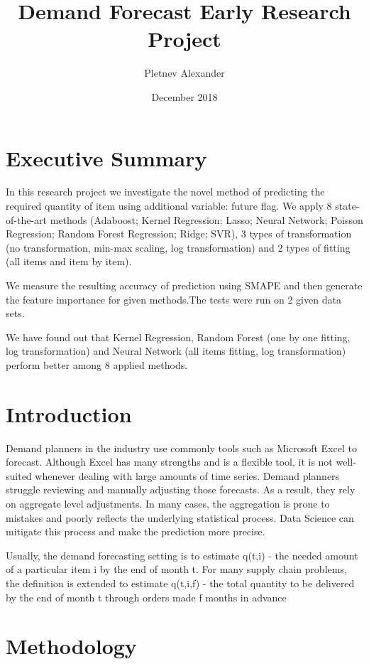 \documentclass{article}
\title{Demand Forecast Early Research Project}
\author{Pletnev Alexander}
\date{December 2018}
\begin{document}
\maketitle
\tableofcontents
\section{Executive Summary}
In this research project we investigate the novel method of predicting the required quantity of item using additional variable: future flag. We apply 8 state-of-the-art methods (Adaboost; Kernel Regression; Lasso; Neural Network; Poisson Regression; Random Forest Regression; Ridge; SVR), 3 types of transformation (no transformation, min-max scaling, log transformation) and 2 types of fitting (all items and item by item). 

We measure the resulting accuracy of prediction using SMAPE and then generate the feature importance for given methods.The tests were run on 2 given data sets.

We have found out that Kernel Regression, Random Forest (one by one fitting, log transformation) and Neural Network (all items fitting, log transformation) perform better among 8 applied methods. 
\section{Introduction}
Demand planners in the industry use commonly tools such as Microsoft Excel to forecast. Although Excel has many strengths and is a flexible tool, it is not well-suited whenever dealing with large amounts of time series. Demand planners struggle reviewing and manually adjusting those forecasts. As a result, they rely on aggregate level adjustments. In many cases, the aggregation is prone to mistakes and poorly reflects the underlying statistical process. Data Science can mitigate this process and make the prediction more precise. 

Usually, the demand forecasting setting is to estimate q(t,i) - the needed amount of a particular item i by the end of month t. For many supply chain problems, the definition is extended to estimate q(t,i,f) - the total quantity to be delivered by the end of month t through orders made f months in advance
\section{Methodology}
\end{document}
